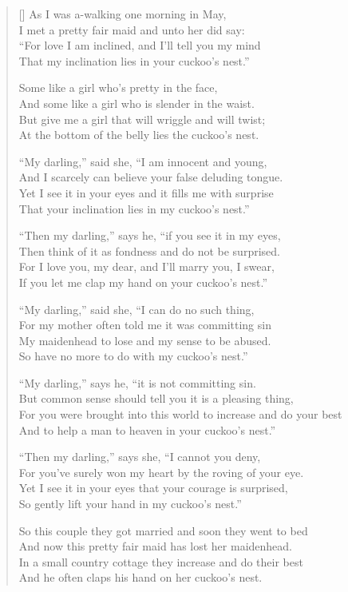 \pagebreak
\settowidth{\versewidth}{And I scarcely can believe your false deluding tongue.}
\begin{verse}[\versewidth]
As I was a-walking one morning in May,\\
I met a pretty fair maid and unto her did say:\\
``For love I am inclined, and I'll tell you my mind\\
That my inclination lies in your cuckoo's nest.''

\begin{chorus}
Some like a girl who's pretty in the face,\\
And some like a girl who is slender in the waist.\\
But give me a girl that will wriggle and will twist;\\
At the bottom of the belly lies the cuckoo's nest.
\end{chorus}

``My darling,'' said she, ``I am innocent and young,\\
And I scarcely can believe your false deluding tongue.\\
Yet I see it in your eyes and it fills me with surprise\\
That your inclination lies in my cuckoo's nest.''


``Then my darling,'' says he, ``if you see it in my eyes,\\
Then think of it as fondness and do not be surprised.\\
For I love you, my dear, and I'll marry you, I swear,\\
If you let me clap my hand on your cuckoo's nest.''

``My darling,'' said she, ``I can do no such thing,\\
For my mother often told me it was committing sin\\
My maidenhead to lose and my sense to be abused.\\
So have no more to do with my cuckoo's nest.''

``My darling,'' says he, ``it is not committing sin.\\
But common sense should tell you it is a pleasing thing,\\
For you were brought into this world to increase and do your best\\
And to help a man to heaven in your cuckoo's nest.''

``Then my darling,'' says she, ``I cannot you deny,\\
For you've surely won my heart by the roving of your eye.\\
Yet I see it in your eyes that your courage is surprised,\\
So gently lift your hand in my cuckoo's nest.''


So this couple they got married and soon they went to bed\\
And now this pretty fair maid has lost her maidenhead.\\
In a small country cottage they increase and do their best\\
And he often claps his hand on her cuckoo's nest.
\end{verse}
